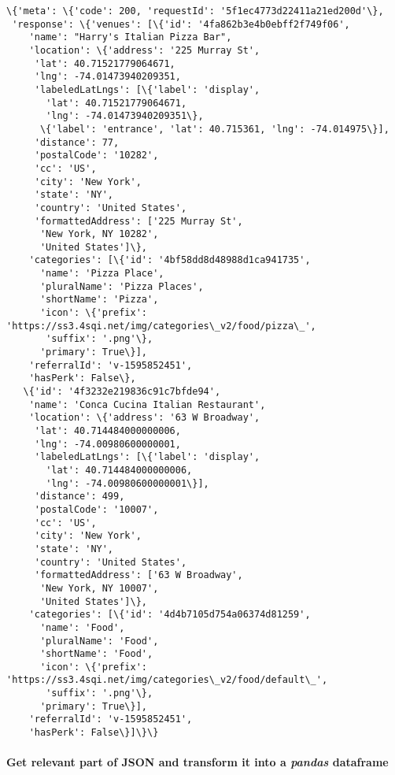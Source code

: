 \documentclass[11pt]{article}
\makeatletter
\newcommand{\boxspacing}{\kern\kvtcb@left@rule\kern\kvtcb@boxsep}
\newcommand{\prompt}[4]{
        \ttfamily\llap{{\color{#2}[#3]:\hspace{3pt}#4}}\vspace{-\baselineskip}
    }
\makeatother
\begin{document}
            \begin{tcolorbox}[breakable, size=fbox, boxrule=.5pt, pad at break*=1mm, opacityfill=0]
\prompt{Out}{outcolor}{8}{\boxspacing}
\begin{Verbatim}[commandchars=\\\{\}]
\{'meta': \{'code': 200, 'requestId': '5f1ec4773d22411a21ed200d'\},
 'response': \{'venues': [\{'id': '4fa862b3e4b0ebff2f749f06',
    'name': "Harry's Italian Pizza Bar",
    'location': \{'address': '225 Murray St',
     'lat': 40.71521779064671,
     'lng': -74.01473940209351,
     'labeledLatLngs': [\{'label': 'display',
       'lat': 40.71521779064671,
       'lng': -74.01473940209351\},
      \{'label': 'entrance', 'lat': 40.715361, 'lng': -74.014975\}],
     'distance': 77,
     'postalCode': '10282',
     'cc': 'US',
     'city': 'New York',
     'state': 'NY',
     'country': 'United States',
     'formattedAddress': ['225 Murray St',
      'New York, NY 10282',
      'United States']\},
    'categories': [\{'id': '4bf58dd8d48988d1ca941735',
      'name': 'Pizza Place',
      'pluralName': 'Pizza Places',
      'shortName': 'Pizza',
      'icon': \{'prefix': 'https://ss3.4sqi.net/img/categories\_v2/food/pizza\_',
       'suffix': '.png'\},
      'primary': True\}],
    'referralId': 'v-1595852451',
    'hasPerk': False\},
   \{'id': '4f3232e219836c91c7bfde94',
    'name': 'Conca Cucina Italian Restaurant',
    'location': \{'address': '63 W Broadway',
     'lat': 40.714484000000006,
     'lng': -74.00980600000001,
     'labeledLatLngs': [\{'label': 'display',
       'lat': 40.714484000000006,
       'lng': -74.00980600000001\}],
     'distance': 499,
     'postalCode': '10007',
     'cc': 'US',
     'city': 'New York',
     'state': 'NY',
     'country': 'United States',
     'formattedAddress': ['63 W Broadway',
      'New York, NY 10007',
      'United States']\},
    'categories': [\{'id': '4d4b7105d754a06374d81259',
      'name': 'Food',
      'pluralName': 'Food',
      'shortName': 'Food',
      'icon': \{'prefix': 'https://ss3.4sqi.net/img/categories\_v2/food/default\_',
       'suffix': '.png'\},
      'primary': True\}],
    'referralId': 'v-1595852451',
    'hasPerk': False\}]\}\}
\end{Verbatim}
\end{tcolorbox}
        
    \hypertarget{get-relevant-part-of-json-and-transform-it-into-a-pandas-dataframe}{%
\paragraph{\texorpdfstring{Get relevant part of JSON and transform it
into a \emph{pandas}
dataframe}{Get relevant part of JSON and transform it into a pandas dataframe}}\label{get-relevant-part-of-json-and-transform-it-into-a-pandas-dataframe}}
\end{document}
